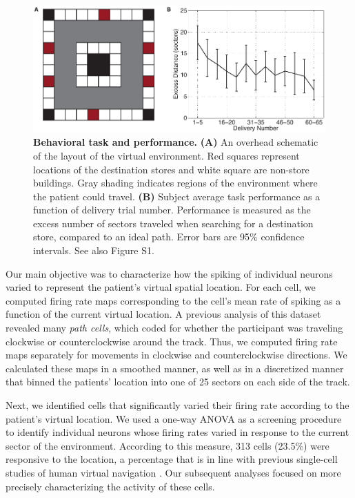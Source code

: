 \begin{figure} \centering \includegraphics[width=.9\textwidth]{./tex/linearGrids/figs/Figure1} \caption[Behavioral task and performance]{\textbf{Behavioral task and performance.} \textbf{(A)} An overhead schematic of the layout of the virtual environment. Red squares represent locations of the destination stores and white square are non-store buildings. Gray shading indicates regions of the environment where the patient could travel. \textbf{(B)} Subject average task performance as a function of delivery trial number. Performance is measured as the excess number of sectors traveled when searching for a destination store, compared to an ideal path. Error bars are 95\% confidence intervals. See also Figure S1.} \label{fig:behavior}
\end{figure}


Our main objective was to characterize how the spiking of individual neurons varied to represent  the patient's virtual spatial location. For each cell, we computed firing rate maps corresponding to the cell's mean rate of spiking as a function of the current  virtual location. A previous analysis of this dataset \cite{JacoEtal10} revealed  many \emph{path cells}, which coded for whether the participant was traveling clockwise or counterclockwise around the track. Thus, we computed firing rate maps separately for movements in clockwise and counterclockwise directions. We  calculated these maps  in a smoothed manner, as well as in a discretized manner that binned the patients' location into one of 25 sectors on each side of the track.

Next, we identified cells that significantly varied their firing rate according to the patient's virtual location. We used a one-way ANOVA as a screening procedure to identify individual neurons whose firing rates varied in response to the current sector of the environment. According to this measure, 313  cells (23.5\%) were responsive to the location, a percentage that is in line with previous single-cell studies of human virtual navigation \cite{EkstEtal03,JacoEtal10,JacoEtal13}. Our subsequent analyses focused on more precisely characterizing the activity of these cells.



